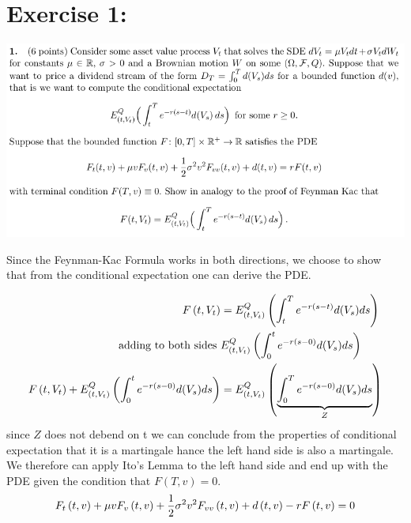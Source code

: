 \documentclass[document.tex]{subfiles}
\begin{document}
\section*{Exercise 1:}

\includegraphics[width=\textwidth]{ex1.png}

Since the Feynman-Kac Formula works in both directions,
we choose to show that from the conditional expectation one can
derive the PDE.

\begin{align*}
	F \left( t, V_t \right) &= E^Q_{\left( t, V_t \right)} \left( \int_t^T e^{-r(s-t)} d(V_s) ds \right) \\
	\text{adding to both sides } & E^Q_{\left( t, V_t \right)} \left( \int_0^t e^{-r(s-0)} d(V_s) ds \right)\\
F \left( t, V_t \right) + E^Q_{\left( t, V_t \right)} \left( \int_0^t e^{-r(s-0)} d(V_s) ds \right) &=
E^Q_{\left( t, V_t \right)} \left( \underbrace{\int_0^T e^{-r(s-0)} d(V_s) ds}_{Z} \right) 
\end{align*}
since $Z$ does not debend on t we can conclude from the properties of conditional expectation that
it is a martingale hance the left hand side is also a martingale.
We therefore can apply Ito's Lemma to the left hand side and end up with the PDE given the condition
that $F(T,v)=0$.
\begin{align*}
	F_t \left( t,v \right) + \mu v F_v \left( t,v \right) +  \frac{1}{2} \sigma^2 v^2 F_{vv} \left( t,v \right) + d \left( t,v \right) - r F \left( t,v \right) =0
\end{align*}
\end{document}
